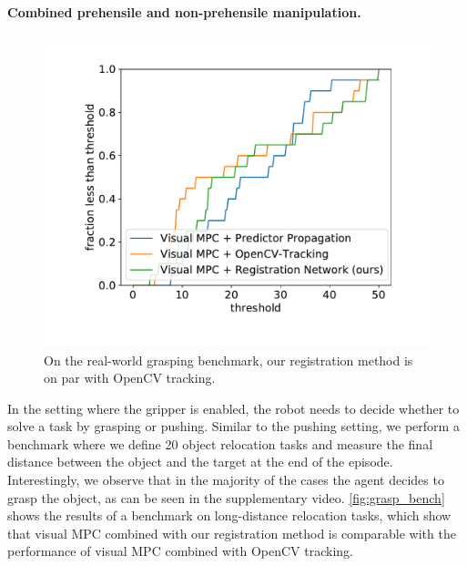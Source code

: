 


\vspace{-0.1in}
\paragraph{Combined prehensile and non-prehensile manipulation.}

\begin{figure}
\vspace{-0.3in}
\centering
\hspace{-0.57cm}\includegraphics[width=0.39\columnwidth]{images/grasping_score_cdf.pdf}
\vspace{-0.9cm}
\caption{\small On the real-world grasping benchmark, our registration method is on par with OpenCV tracking.}
\label{fig:grasp_bench}
\vspace{-0.3in}
\end{figure}

In the setting where the gripper is enabled, the robot needs to decide whether to solve a task by grasping or pushing. Similar to the pushing setting, we perform a benchmark where we define 20 object relocation tasks and measure the final distance between the object and the target at the end of the episode. Interestingly, we observe that in the majority of the cases the agent decides to grasp the object, as can be seen in the supplementary video. \autoref{fig:grasp_bench} shows the results of a benchmark on long-distance relocation tasks, which show that visual MPC combined with our registration method is comparable with the performance of visual MPC combined with OpenCV tracking. 